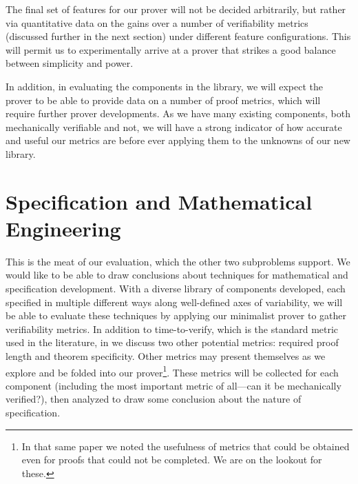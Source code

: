 The final set of features for our prover will not be decided arbitrarily, but rather via quantitative data on the gains over a number of verifiability metrics (discussed further in the next section) under different feature configurations.  This will permit us to experimentally arrive at a prover that strikes a good balance between simplicity and power.

In addition, in evaluating the components in the library, we will expect the prover to be able to provide data on a number of proof metrics, which will require further prover developments.  As we have many existing components, both mechanically verifiable and not, we will have a strong indicator of how accurate and useful our metrics are before ever applying them to the unknowns of our new library.

\section{Specification and Mathematical Engineering}\label{sec:evalEngineering}
This is the meat of our evaluation, which the other two subproblems support.  We would like to be able to draw conclusions about techniques for mathematical and specification development.  With a diverse library of components developed, each specified in multiple different ways along well-defined axes of variability, we will be able to evaluate these techniques by applying our minimalist prover to gather verifiability metrics.  In addition to time-to-verify, which is the standard metric used in the literature, in \cite{smithSpecificationAbstractions} we discuss two other potential metrics: required proof length and theorem specificity.  Other metrics may present themselves as we explore and be folded into our prover\footnote{In that same paper we noted the usefulness of metrics that could be obtained even for proofs that could not be completed.  We are on the lookout for these.}.  These metrics will be collected for each component (including the most important metric of all---can it be mechanically verified?), then analyzed to draw some conclusion about the nature of specification.
